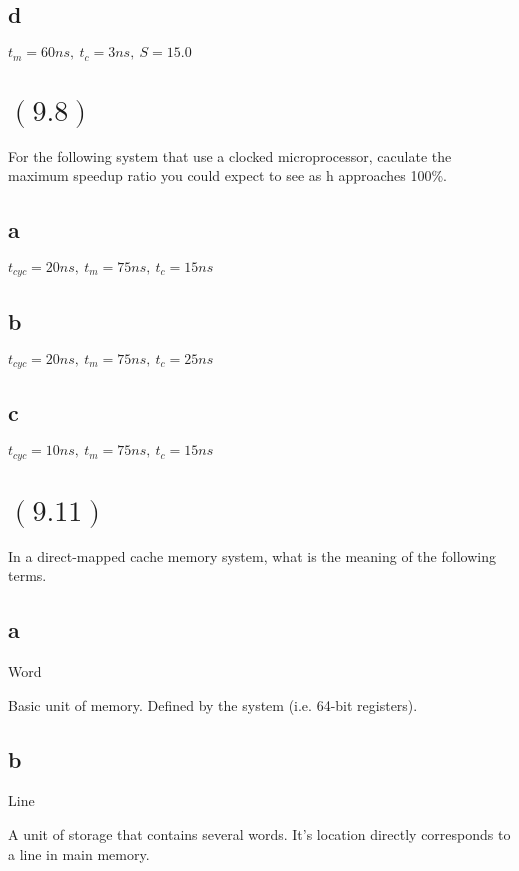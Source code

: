 \documentclass[letterpaper,12pt,titlepage]{article}
\begin{document}
\subsection*{d} $t_m=60ns,~t_c=3ns,~S=15.0$
\begin{mdframed}[style=MyFrame]
\end{mdframed}

\section*{$(9.8)$} For the following system that use a clocked microprocessor, caculate the maximum speedup ratio you could expect to see as h approaches 100\%.

\subsection*{a} $t_{cyc}=20ns,~t_m=75ns,~t_c=15ns$
\begin{mdframed}[style=MyFrame]
\end{mdframed}
\subsection*{b} $t_{cyc}=20ns,~t_m=75ns,~t_c=25ns$
\begin{mdframed}[style=MyFrame]
\end{mdframed}
\subsection*{c} $t_{cyc}=10ns,~t_m=75ns,~t_c=15ns$
\begin{mdframed}[style=MyFrame]
\end{mdframed}

\section*{$(9.11)$} In a direct-mapped cache memory system, what is the meaning of the following terms.

\subsection*{a} Word
\begin{mdframed}[style=MyFrame]
Basic unit of memory. Defined by the system (i.e. 64-bit registers).
\end{mdframed}
\subsection*{b} Line
\begin{mdframed}[style=MyFrame]
A unit of storage that contains several words. It's location directly corresponds to a line in main memory.
\end{mdframed}
\end{document}
